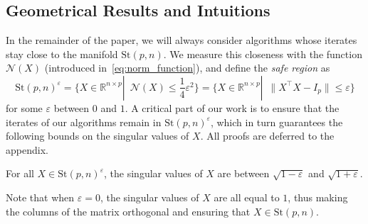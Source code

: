 \documentclass[twoside,11pt]{article}
\newcommand{\stiefel}{{\mathrm{St}(p, n)}}
\begin{document}
\subsection{Geometrical Results and Intuitions}
%

In the remainder of the paper, we will always consider algorithms whose iterates stay close to the manifold $\stiefel$. 
We measure this closeness with the function $\mathcal{N}(X)$ (introduced in~\eqref{eq:norm_function}), and define the \emph{safe region} as 
\begin{equation}
    \label{eq:safe_region}
    \stiefel^{\varepsilon} = \{X\in\mathbb{R}^{n\times p}|\enspace \mathcal{N}(X)\leq \frac14 \varepsilon^2\} = \{X\in\mathbb{R}^{n\times p}|\enspace \|X^\top X - I_p\|\leq \varepsilon\} 
\end{equation}
%
for some $\varepsilon$ between $0$ and $1$. A critical part of our work is to ensure that the iterates of our algorithms remain in $\stiefel^\varepsilon$, which in turn guarantees the following bounds on the singular values of $X$.
All proofs are deferred to the appendix.
\begin{lemma}
\label{lemma:singular_values}
    For all
    $X\in \stiefel^\varepsilon$, the singular values of $X$ are between $\sqrt{ 1 - \varepsilon}$ and $ \sqrt{1 + \varepsilon}$.
\end{lemma}
Note that when $\varepsilon=0$, the singular values of $X$ are all equal to $1$, thus making the columns of the matrix orthogonal and ensuring that $X\in\stiefel$.
\end{document}
